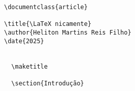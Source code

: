 \begin{lstlisting}[basicstyle={\ttfamily\scriptsize\color{darkgray}}]
\documentclass{article}

\title{\LaTeX nicamente}
\author{Heliton Martins Reis Filho}
\date{2025}


  \maketitle

  \section{Introdução}


\end{lstlisting}
